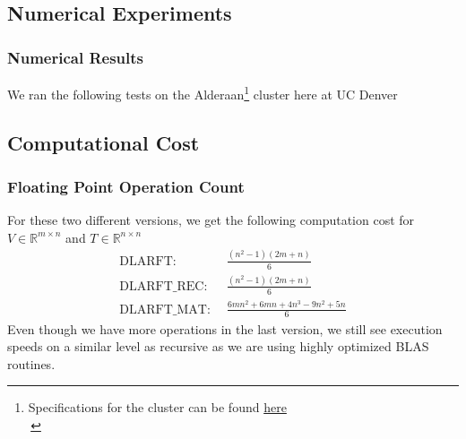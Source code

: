 \documentclass[12pt]{beamer}
\newcommand{\R}{\mathbb{R}}
\begin{document}
    \subsection{Numerical Experiments}
    \begin{frame}
        \frametitle{Numerical Results}
        We ran the following tests on the Alderaan\footnote{Specifications for the cluster can be found 
        \textcolor{blue}{\href{https://ccm-docs.readthedocs.io/en/latest/alderaan\#hardware}{here}}\\\,} 
        cluster here at UC Denver\\
        \begin{center}
        \end{center}
    \end{frame}
    \subsection{Computational Cost}
    \begin{frame}
        \frametitle{Floating Point Operation Count}
        For these two different versions, we get the following computation cost for $V\in\R^{m\times n}$ and  $T\in\R^{n\times n}$
        \begin{align*}
            \text{DLARFT: }&\,  \frac{(n^2-1)(2m+n)}{6}\\
            \text{DLARFT\_REC: }&\, \frac{(n^2-1)(2m+n)}{6}\\
            \text{DLARFT\_MAT: }&\, \frac{6mn^2 + 6mn +4n^3 -9n^2 + 5n}{6}
        \end{align*}
        Even though we have more operations in the last version, we still see execution speeds on a similar level
        as recursive as we are using highly optimized BLAS routines.
    \end{frame}
\end{document}

